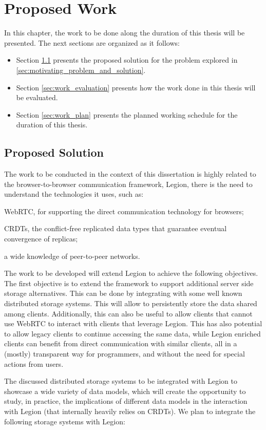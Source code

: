\chapter{Proposed Work}
\label{cha:proposed_work}
In this chapter, the work to be done along the duration of this thesis will be presented. The next sections are organized as it follows:
\begin{itemize}
\item Section \ref{sec:proposed_solution} presents the proposed solution for the problem explored in \ref{sec:motivating_problem_and_solution}.

\item Section \ref{sec:work_evaluation} presents how the work done in this thesis will be evaluated.

\item Section \ref{sec:work_plan} presents the planned working schedule for the duration of this thesis.

\end{itemize}

\section{Proposed Solution}
\label{sec:proposed_solution}
The work to be conducted in the context of this dissertation is highly related to the browser-to-browser communication framework, Legion, there is the need to understand the technologies it uses, such as: \begin{enumerate*}[(i)]
	\item WebRTC, for supporting the direct communication technology for browsers;
	\item CRDTs, the conflict-free replicated data types that guarantee eventual convergence of replicas;
	\item a wide knowledge of peer-to-peer networks.
\end{enumerate*}\par
	The work to be developed will extend Legion to achieve the following objectives. The first objective is to extend the framework to support additional server side storage alternatives. This can be done by integrating with some well known distributed storage systems. This will allow to persistently store the data shared among clients. Additionally, this can also be useful to allow clients that cannot use WebRTC to interact with clients that leverage Legion. This has also potential to allow legacy clients to continue accessing the same data, while Legion enriched clients can benefit from direct communication with similar clients, all in a (mostly) transparent way for programmers, and without the need for special actions from users.\par
	The discussed distributed storage systems to be integrated with Legion to showcase a wide variety of data models, which will create the opportunity to study, in practice, the implications of different data models in the interaction with Legion (that internally heavily relies on CRDTs). We plan to integrate the following storage systems with Legion:

